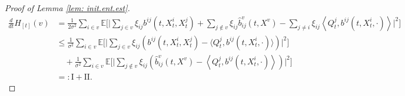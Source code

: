 \documentclass[11pt,reqno]{amsart}
\numberwithin{equation}{section}
\theoremstyle{definition}
\def\E{{\mathbb E}}
\begin{document}
\begin{proof}[Proof of Lemma \ref{lem: init.ent.est}]
		\begin{align}
			\frac{d}{dt} H_{[t]}(v)  & = \frac{1}{2 \sigma^2} \sum_{i \in v} \E \bigg[ \bigg| 
			\sum_{j \in v}\xi_{ij} b^{ij}(t, X^i_t, X^j_t) + \sum_{j \notin v} \xi_{ij} \widehat{b}^v_{ij} (t, X^v) -\sum_{j \neq i} \xi_{ij}\left\langle Q^{j}_t, b^{ij}(t, X^i_t, \cdot)\right\rangle  \bigg|^2 \bigg] \nonumber\\
			& \leq \frac{1}{\sigma^2} \sum_{i \in v} \E \bigg[\bigg| \sum_{j \in v}\xi_{ij} \left( b^{ij}(t, X^i_t, X^j_t) - \big\langle Q^{j}_t, b^{ij}(t, X^i_t, \cdot) \big\rangle \right) \bigg|^2\bigg] \nonumber\\
			& \quad + \frac{1}{\sigma^2} \sum_{i \in v} \E \bigg[\bigg| \sum_{j \notin v}\xi_{ij} \left( \widehat{b}^v_{ij} (t, X^v)- \left\langle Q^{j}_t, b^{ij}(t, X^i_t, \cdot) \right\rangle \right) \bigg|^2\bigg] \nonumber \\
			&  =: \text{I} + \text{II}. \label{def.I.II}
		\end{align}
		


\end{proof}
\end{document}

